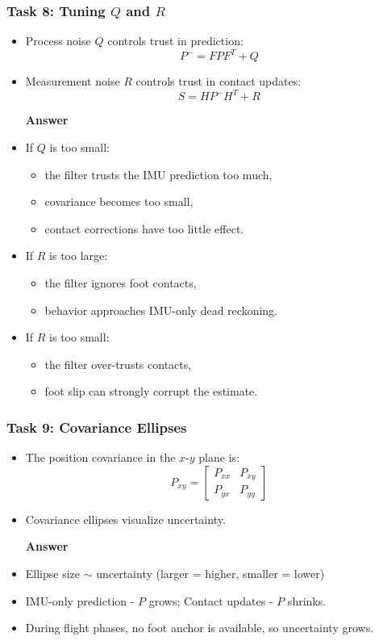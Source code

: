 \documentclass[aspectratio=169]{beamer}
\begin{document}
\begin{frame}
	\frametitle{Task 8: Tuning $Q$ and $R$}
	
	\begin{itemize}
		\item Process noise $Q$ controls trust in prediction:
		\[
		P^- = FP F^T + Q
		\]
		
		\item Measurement noise $R$ controls trust in contact updates:
		\[
		S = HP^-H^T + R
		\]
		
		\vspace{-0.4cm} \pause
		\textbf{Answer}
		\item If $Q$ is too small:
		\begin{itemize}
			\item the filter trusts the IMU prediction too much,
			\item covariance becomes too small,
			\item contact corrections have too little effect.
		\end{itemize}
		
		\item If $R$ is too large:
		\begin{itemize}
			\item the filter ignores foot contacts,
			\item behavior approaches IMU-only dead reckoning.
		\end{itemize}
		
		\item If $R$ is too small:
		\begin{itemize}
			\item the filter over-trusts contacts,
			\item foot slip can strongly corrupt the estimate.
		\end{itemize}
	\end{itemize}
	
\end{frame}


\begin{frame}
	\frametitle{Task 9: Covariance Ellipses}
	
	\begin{itemize}
		\item The position covariance in the $x$-$y$ plane is:
		\[
		P_{xy}
		=
		\begin{bmatrix}
			P_{xx} & P_{xy} \\
			P_{yx} & P_{yy}
		\end{bmatrix}
		\]
		
		\item Covariance ellipses visualize uncertainty.
		
		\pause
		\textbf{Answer}
		
		\item Ellipse size $\sim$ uncertainty (larger = higher, smaller = lower)		
		\item IMU-only prediction - $P$ grows; Contact updates - $P$ shrinks.		
		\item During flight phases, no foot anchor is available, so uncertainty grows.
	\end{itemize}
	
\end{frame}
\end{document}
